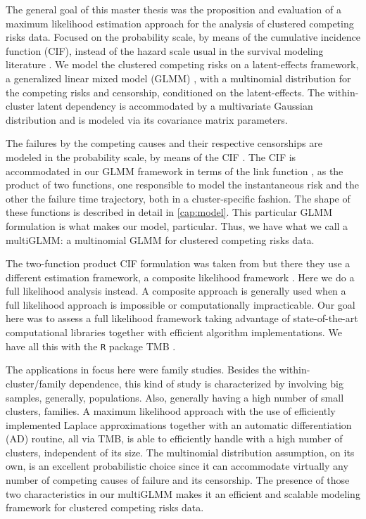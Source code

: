 The general goal of this master thesis was the proposition and
evaluation of a maximum likelihood estimation approach for the analysis
of clustered competing risks data. Focused on the probability scale, by
means of the cumulative incidence function (CIF), instead of the hazard
scale usual in the survival modeling literature \cite{kalb&prentice}. We
model the clustered competing risks on a latent-effects framework, a
generalized linear mixed model (GLMM) \cite{GLMM}, with a multinomial
distribution for the competing risks and censorship, conditioned on the
latent-effects. The within-cluster latent dependency is accommodated by
a multivariate Gaussian distribution and is modeled via its covariance
matrix parameters.

The failures by the competing causes and their respective censorships
are modeled in the probability scale, by means of the CIF
\cite{kalb&prentice,andersen12}. The CIF is accommodated in our GLMM
framework in terms of the link function \cite{GLM89}, as the product of
two functions, one responsible to model the instantaneous risk and the
other the failure time trajectory, both in a cluster-specific
fashion. The shape of these functions is described in detail
in \autoref{cap:model}. This particular GLMM formulation is what makes
our model, particular. Thus, we have what we call a multiGLMM: a
multinomial GLMM for clustered competing risks data.

The two-function product CIF formulation was taken from
 but there they use a different estimation
framework, a composite likelihood framework
\cite{lindsay88,cox&reid04,varin11}. Here we do a full likelihood
analysis instead. A composite approach is generally used when a full
likelihood approach is impossible or computationally impracticable. Our
goal here was to assess a full likelihood framework taking advantage of
state-of-the-art computational libraries together with efficient
algorithm implementations. We have all this with
the \texttt{R} \cite{R21} package TMB \cite{TMB}.

The applications in focus here were family studies. Besides the
within-cluster/family dependence, this kind of study is characterized by
involving big samples, generally, populations. Also, generally having a
high number of small clusters, families. A maximum likelihood approach
with the use of efficiently implemented Laplace approximations
\cite{tierney,patrao} together with an automatic differentiation (AD)
\cite{corestats,nocedal&wright} routine, all via TMB, is able to
efficiently handle with a high number of clusters, independent of its
size. The multinomial distribution assumption, on its own, is an
excellent probabilistic choice since it can accommodate virtually any
number of competing causes of failure and its censorship. The presence
of those two characteristics in our multiGLMM makes it an efficient and
scalable modeling framework for clustered competing risks data.

